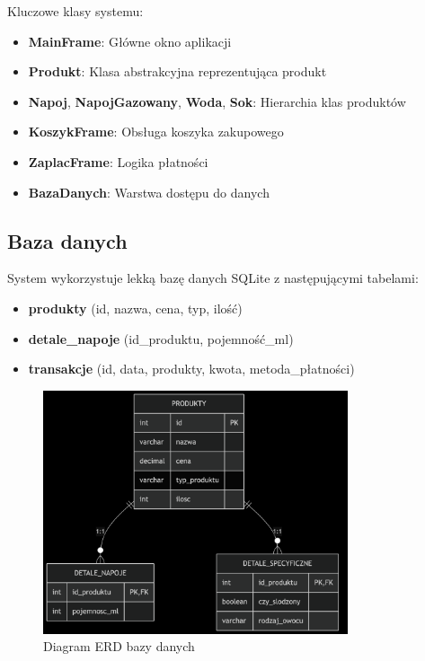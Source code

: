 Kluczowe klasy systemu:
\begin{itemize}
\item \textbf{MainFrame}: Główne okno aplikacji
\item \textbf{Produkt}: Klasa abstrakcyjna reprezentująca produkt
\item \textbf{Napoj}, \textbf{NapojGazowany}, \textbf{Woda}, \textbf{Sok}: Hierarchia klas produktów
\item \textbf{KoszykFrame}: Obsługa koszyka zakupowego
\item \textbf{ZaplacFrame}: Logika płatności
\item \textbf{BazaDanych}: Warstwa dostępu do danych
\end{itemize}



\subsection{Baza danych}
System wykorzystuje lekką bazę danych SQLite z następującymi tabelami:
\begin{itemize}
\item \textbf{produkty} (id, nazwa, cena, typ, ilość)
\item \textbf{detale\_napoje} (id\_produktu, pojemność\_ml)
\item \textbf{transakcje} (id, data, produkty, kwota, metoda\_płatności)
\end{itemize}

\begin{figure}[H]
\centering
\includegraphics[width=0.8\textwidth]{figures/erd_diagram.png}
\caption{Diagram ERD bazy danych}
\label{fig:erd_diagram}
\end{figure}